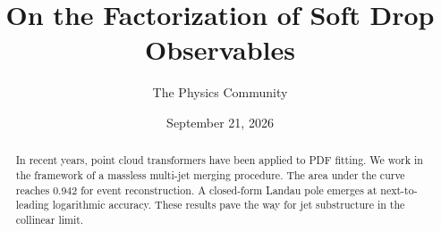 \documentclass[11pt]{article}
\title{On the Factorization of Soft Drop Observables}
\author{The Physics Community}
\date{September 21, 2026}
\numberwithin{equation}{section}
\theoremstyle{definition}
\theoremstyle{remark}
\begin{document}
\maketitle
\begin{abstract}
In recent years, point cloud transformers have been applied to PDF
fitting. We work in the framework of a massless multi-jet merging
procedure. The area under the curve reaches 0.942 for event
reconstruction. A closed-form Landau pole emerges at next-to-leading
logarithmic accuracy. These results pave the way for jet substructure in
the collinear limit.
\end{abstract}
\tableofcontents




\nocite{*}


\end{document}
